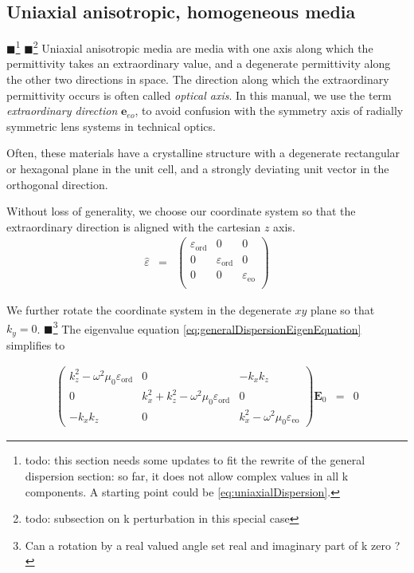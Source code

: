 \documentclass[12pt,a4paper,twoside,openright,BCOR10mm,headsepline,titlepage,abstracton,chapterprefix,final]{scrreprt}
\newcommand\Vector[1]{{\mathbf{#1}}}
\newcommand\vacuum{0}
\newcommand\wavenumber{k}
\newcommand\Tensor[1]{\hat{#1}}
\newcommand\scalarEfield{E}
\newcommand\Efield{\Vector{\scalarEfield}}
\newcommand\vacuumpermeability{\scalarpermeability_{\vacuum}}
\newcommand\scalarpermeability{\mu}
\newcommand\permittivity{\Tensor{\scalarpermittivity}}
\newcommand\scalarpermittivity{\varepsilon}
\newcommand\ordi{\text{ord}}
\newcommand\eo{\text{eo}}
\newcommand{\remark}[1]{{\color{red}$\blacksquare$}\footnote{{\color{red}#1}}}
\begin{document}
\subsection{Uniaxial anisotropic, homogeneous media}
\remark{todo: this section needs some updates to fit the rewrite of the general dispersion section: so far, it does not allow complex values in all k components. A starting point could be \ref{eq:uniaxialDispersion}.}
\remark{todo: subsection on k perturbation in this special case}
Uniaxial anisotropic media are media with one axis along which the permittivity takes an extraordinary value, 
and a degenerate permittivity along the other two directions in space.
The direction along which the extraordinary permittivity occurs is often called \emph{optical axis}. 
In this manual, we use the term \emph{extraordinary direction} $\Vector{e}_{eo}$, to avoid confusion with the symmetry axis of radially symmetric lens systems in technical optics.

Often, these materials have a crystalline structure with a degenerate rectangular or hexagonal plane in the unit cell, 
and a strongly deviating unit vector in the orthogonal direction. 

Without loss of generality, we choose our coordinate system so that the extraordinary direction is aligned with the cartesian $z$ axis.
\begin{eqnarray}
 \permittivity &=&
 \begin{pmatrix}
  \scalarpermittivity_{\ordi}  & 0 & 0 \\
  0 & \scalarpermittivity_{\ordi}  & 0 \\
  0 & 0 & \scalarpermittivity_{\eo}   \\
 \end{pmatrix}
\end{eqnarray}

We further rotate the coordinate system in the degenerate $xy$ plane so that $\wavenumber_y = 0$.
\remark{Can a rotation by a real valued angle set real and imaginary part of k zero ?}
The eigenvalue equation \ref{eq:generalDispersionEigenEquation} simplifies to

\begin{eqnarray}
\begin{pmatrix}
 \wavenumber_z^2 - \omega^2 \vacuumpermeability \scalarpermittivity_{\ordi} 
 &
 0
 &
 - \wavenumber_x \wavenumber_z 
 \\
 0
 &
 \wavenumber_x^2 + \wavenumber_z^2 - \omega^2 \vacuumpermeability \scalarpermittivity_{\ordi} 
 &
 0 
 \\
 - \wavenumber_x \wavenumber_z 
 &
 0 
 &
 \wavenumber_x^2 - \omega^2 \vacuumpermeability \scalarpermittivity_{\eo}  
\end{pmatrix}
\Efield_0
&=& 0
\end{eqnarray}
\end{document}
